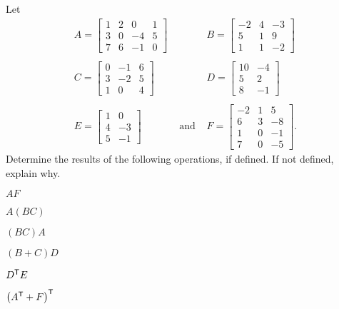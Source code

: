 
\ExampleIntro

\begin{example} Let 
\[\begin{array}{ccc}
A = \left[ \begin{array}{ccrc} 1&2&0&1\\3&0&-4&5\\7&6&-1&0 \end{array} \right] &&  B = \left[ \begin{array}{rcr} -2&4&-3\\5&1&9\\1&1&-2 \end{array} \right] \\ 
&& \\
C = \left[ \begin{array}{crc} 0&-1&6\\3&-2&5\\1&0&4 \end{array} \right] && D = \left[ \begin{array}{cr} 10&-4\\5&2\\8&-1 \end{array} \right] \\ 
&& \\
E = \left[ \begin{array}{cr} 1&0\\4&-3\\5&-1 \end{array} \right] &\text{ and }  & F = \left[ \begin{array}{rcr} -2&1&5\\6&3&-8\\1&0&-1\\ 7&0&-5 \end{array} \right].
\end{array}\]
Determine the results of the following operations, if defined. If not defined, explain why.
	\ba
	\begin{minipage}{1.5in}
	\item $AF$
	\end{minipage}
	\begin{minipage}{1.5in}
	\item $A(BC)$
	\end{minipage}
	\begin{minipage}{1.5in}
	\item $(BC)A$
	\end{minipage}
	
	\begin{minipage}{1.5in}
	\item $(B+C)D$
	\end{minipage}
	\begin{minipage}{1.5in}
	\item $D^{\mathsf{T}}E$
	\end{minipage}
	\begin{minipage}{1.5in}
	\item $\left(A^{\mathsf{T}}+F\right)^{\mathsf{T}}$
	\end{minipage}
	\ea


\end{example}

